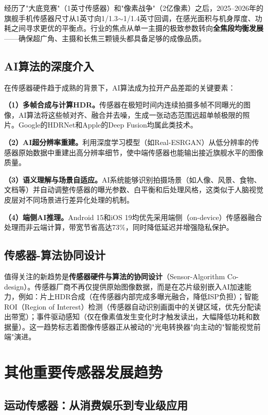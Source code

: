 \documentclass[12pt, a4paper]{ctexart}
\begin{document}
经历了"大底竞赛"（1英寸传感器）和"像素战争"（2亿像素）之后，2025--2026年的旗舰手机传感器尺寸从1英寸向1/1.3$\sim$1/1.4英寸回调，在感光面积与机身厚度、功耗之间寻求更优的平衡点\cite{itbear2026}。行业的焦点从单一主摄的极致参数转向\textbf{全焦段均衡发展}——确保超广角、主摄和长焦三颗镜头都具备足够的成像品质。

\subsection{AI算法的深度介入}

在传感器硬件趋于成熟的背景下，AI算法成为拉开产品差距的关键要素：

\textbf{（1）多帧合成与计算HDR。}传感器在极短时间内连续拍摄多帧不同曝光的图像，AI算法将这些帧对齐、融合并去噪，生成一张动态范围远超单帧极限的照片。Google的HDRNet和Apple的Deep Fusion均属此类技术。

\textbf{（2）AI超分辨率重建。}利用深度学习模型（如Real-ESRGAN）从低分辨率的传感器原始数据中重建出高分辨率细节，使中端传感器也能输出接近旗舰水平的图像质量。

\textbf{（3）语义理解与场景自适应。}AI系统能够识别拍摄场景（如人像、风景、食物、文档等）并自动调整传感器的曝光参数、白平衡和后处理风格，这类似于人脑视觉皮层对不同场景进行差异化处理的机制。

\textbf{（4）端侧AI推理。}Android 15和iOS 19均优先采用端侧（on-device）传感器融合处理而非云端计算，带宽节省高达73\%，同时降低延迟并增强隐私保护\cite{alibaba2026}。

\subsection{传感器-算法协同设计}

值得关注的新趋势是\textbf{传感器硬件与算法的协同设计}（Sensor-Algorithm Co-design）。传感器厂商不再仅提供原始图像数据，而是在芯片级别嵌入AI加速能力，例如：片上HDR合成（在传感器内部完成多曝光融合，降低ISP负担）；智能ROI（Region of Interest）检测（传感器自动识别画面中的关键区域，优先分配读出带宽）；事件驱动感知（仅在像素值发生变化时才触发读出，大幅降低功耗和数据量）。这一趋势标志着图像传感器正从被动的"光电转换器"向主动的"智能视觉前端"演进。


\section{其他重要传感器发展趋势}

\subsection{运动传感器：从消费娱乐到专业级应用}
\end{document}
